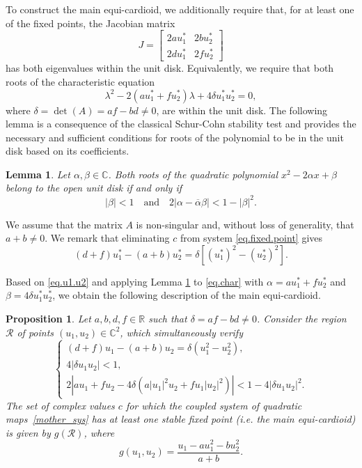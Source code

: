 \documentclass[10pt]{article}
\newtheorem{prop}[thm]{Proposition}
\newtheorem{lemma}[thm]{Lemma}
\begin{document}
To construct the main equi-cardioid, we additionally require that, for at least one of the fixed points, the Jacobian matrix
\[
J =
\begin{bmatrix}
2 a u_1^* & 2 b u_2^* \\
2 d u_1^* & 2 f u_2^*
\end{bmatrix}
\]
has both eigenvalues within the unit disk. Equivalently, we require that both roots of the characteristic equation
\begin{equation} \label{eq.char}
\lambda^2 - 2 (a u_1^* + fu_2^*) \lambda + 4 \delta u_1^* u_2^*=0,
\end{equation}
where $\delta = \det(A) = af - bd \ne 0$, are within the unit disk. The following lemma is a consequence of the classical Schur-Cohn stability test \cite{henrici1974computational} and provides the necessary and sufficient conditions for roots of the polynomial to be in the unit disk based on its coefficients.

\begin{lemma}\label{lem.quadratic.poly}
Let $\alpha, \beta\in\mathbb{C}$. Both roots of the quadratic polynomial $x^2-2\alpha x+\beta$ belong to the open unit disk if and only if
\begin{equation} \label{ineg.lemma}
    |\beta| < 1
    \quad \text{and} \quad
    2 |\alpha-\overline{\alpha}\beta| < 1-|\beta|^2.
\end{equation}
\end{lemma}

We assume that the matrix $A$ is non-singular and, without loss of generality, that $a+b\neq 0$. We remark that eliminating $c$ from system \eqref{eq.fixed.point} gives
\begin{equation} \label{eq.u1.u2}
    (d + f) u_1^* - (a + b) u_2^* = \delta [(u_1^*)^2 - (u_2^*)^2].
\end{equation}

Based on \eqref{eq.u1.u2} and applying Lemma \ref{lem.quadratic.poly} to \eqref{eq.char} with $\alpha = a u_1^* + f u_2^*$ and $\beta = 4 \delta u_1^* u_2^*$, we obtain the following description of the main equi-cardioid.

\begin{prop}\label{prop.cardioid}
Let $a, b, d, f \in \mathbb{R}$ such that $\delta = a f - b d \ne 0$. Consider the region $\mathcal{R}$ of points $(u_1, u_2)\in\mathbb{C}^2$, which simultaneously verify
\[
\begin{cases}
    (d + f) u_1 - (a + b) u_2 = \delta (u_1^2 - u_2^2), \\
    4|\delta u_1u_2| < 1, \\
    2|a u_1 + f u_2-4\delta(a|u_1|^2u_2+fu_1|u_2|^2)| <1 - 4|\delta u_1 u_2|^2.
\end{cases}
\]
The set of complex values $c$ for which the coupled system of quadratic maps~\eqref{mother_sys} has at least one stable fixed point (i.e. the main equi-cardioid) is given by $g(\mathcal{R})$, where
\[
g(u_1,u_2)=\frac{u_1-au_1^2-bu_2^2}{a+b}.
\]
\end{prop}
\end{document}
